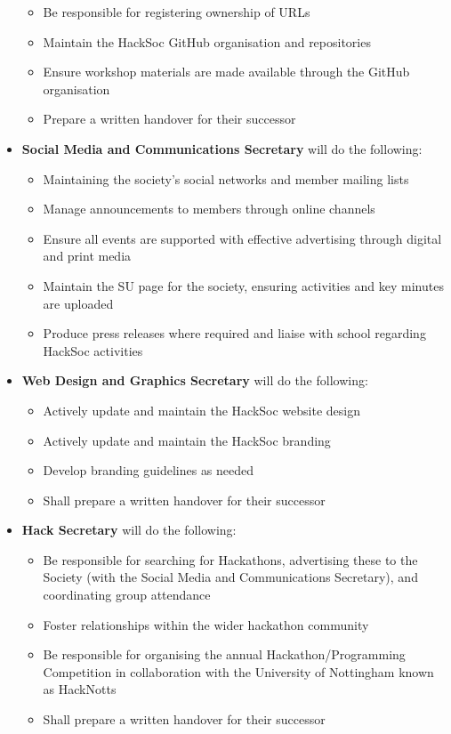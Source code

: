 \documentclass[a4paper,twoside,notitlepage,11pt]{article}
\begin{document}
\begin{itemize}
\begin{itemize}
	  \item Be responsible for registering ownership of URLs
	  \item Maintain the HackSoc GitHub organisation and repositories
	  \item Ensure workshop materials are made available through the GitHub organisation
	  \item Prepare a written handover for their successor
	\end{itemize}
	\item \textbf{Social Media and Communications Secretary} will do the following:
	\begin{itemize}
	  \item Maintaining the society's social networks and member mailing lists
	  \item Manage announcements to members through online channels
	  \item Ensure all events are supported with effective advertising through digital and print media
	  \item Maintain the SU page for the society, ensuring activities and key minutes are uploaded
	  \item Produce press releases where required and liaise with school regarding HackSoc activities
	\end{itemize}
	\item \textbf{Web Design and Graphics Secretary} will do the following:
	\begin{itemize}
	  \item Actively update and maintain the HackSoc website design
	  \item Actively update and maintain the HackSoc branding
	  \item Develop branding guidelines as needed
	  \item Shall prepare a written handover for their successor
	\end{itemize}
	\item \textbf{Hack Secretary} will do the following:
	\begin{itemize}
	  \item Be responsible for searching for Hackathons, advertising these to the Society (with the Social Media and Communications Secretary), and coordinating group attendance
	  \item Foster relationships within the wider hackathon community
	  \item Be responsible for organising the annual Hackathon/Programming Competition in collaboration with the University of Nottingham known as HackNotts
	  \item Shall prepare a written handover for their successor
	\end{itemize}

\end{itemize}
\end{document}
